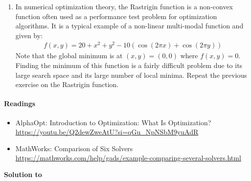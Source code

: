 \begin{enumerate}
\item
In numerical optimization theory, the Rastrigin function is a non-convex function
  often used as a performance test problem for optimization algorithms.
It is a typical example of a non-linear multi-modal function and given by:
\begin{align*}
f(x,y) = 20 + x^2 + y^2 - 10(\cos(2\pi x)+\cos(2\pi y))
\end{align*}
Note that the global minimum is at \((x, y)=(0, 0)\) where \(f(x, y)=0\).
Finding the minimum of this function is a fairly difficult problem
  due to its large search space and its large number of local minima.
Repeat the previous exercise on the Rastrigin function.
\end{enumerate}


\paragraph{Readings}
\begin{itemize}
\item AlphaOpt: Introduction to Optimization: What Is Optimization?\\
\url{https://youtu.be/Q2dewZweAtU?si=qGu_NpNSbM9yuAdR}
\item MathWorks: Comparison of Six Solvers\\
\url{https://mathworks.com/help/gads/example-comparing-several-solvers.html}
\end{itemize}

\begin{solution}\textbf{Solution to }
\ifDisplaySolutions%

\fi
\newpage
\end{solution}